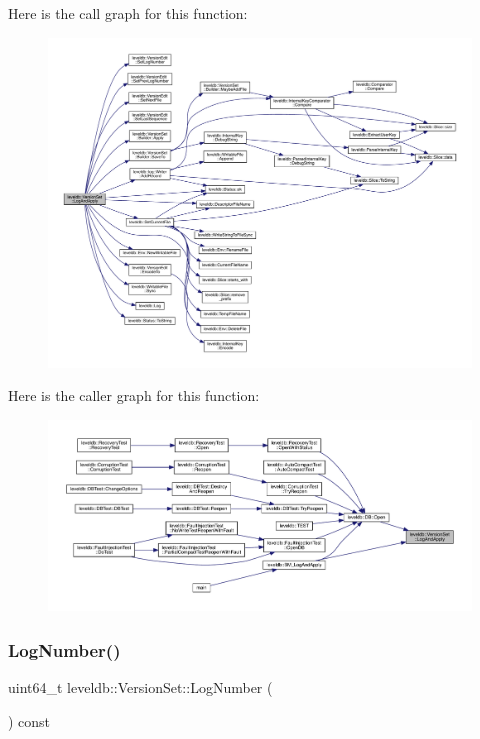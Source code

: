 Here is the call graph for this function\+:
\nopagebreak
\begin{figure}[H]
\begin{center}
\leavevmode
\includegraphics[width=350pt]{classleveldb_1_1_version_set_ac1d014901be7095ace1aaec0cf391fb6_cgraph}
\end{center}
\end{figure}
Here is the caller graph for this function\+:
\nopagebreak
\begin{figure}[H]
\begin{center}
\leavevmode
\includegraphics[width=350pt]{classleveldb_1_1_version_set_ac1d014901be7095ace1aaec0cf391fb6_icgraph}
\end{center}
\end{figure}
\mbox{\label{classleveldb_1_1_version_set_a78960eb465191babdd19ed75bc3ea91b}} 
\subsubsection{\texorpdfstring{LogNumber()}{LogNumber()}}
{\footnotesize\ttfamily uint64\+\_\+t leveldb\+::\+Version\+Set\+::\+Log\+Number (\begin{DoxyParamCaption}{ }\end{DoxyParamCaption}) const\hspace{0.3cm}{\ttfamily [inline]}}

